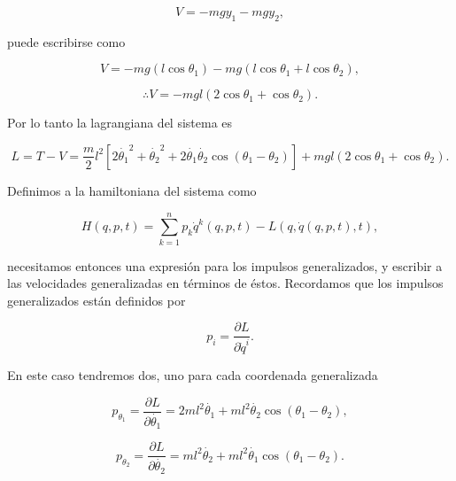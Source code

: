 \documentclass[a4paper,10pt]{article}
\numberwithin{equation}{section}
\begin{document}
\begin{equation}
 V = -mgy_1 - mgy_2,
\end{equation}

puede escribirse como

\begin{equation}
 V = - mg(l\cos{\theta_1}) - mg(l\cos{\theta_1} + l\cos{\theta_2}),
\end{equation}

\begin{equation}
 \therefore V = - mgl(2\cos{\theta_1} + \cos{\theta_2}).
\end{equation}

Por lo tanto la lagrangiana del sistema es 

\begin{equation}
 L = T - V = \frac{m}{2}l^2\left[2\dot{\theta_1}^2 + \dot{\theta_2}^2 
 + 2\dot{\theta_1}\dot{\theta_2}\cos{(\theta_1 - \theta_2)}\right]
 + mgl(2\cos{\theta_1} + \cos{\theta_2}).
\end{equation}

Definimos a la hamiltoniana del sistema como

\begin{equation}
 H(q,p,t) = \sum_{k=1}^n p_k \dot{q}^k(q,p,t) - L(q,\dot{q}(q,p,t),t),
 \label{eq:hamiltonianaDoblePend}
\end{equation}

necesitamos entonces una expresión para los impulsos generalizados, y escribir a las 
velocidades generalizadas en términos de éstos. Recordamos que los impulsos generalizados 
están definidos por 

\begin{equation}
p_i = \frac{\partial L}{\partial \dot{q}^i}.
\end{equation}

En este caso tendremos dos, uno para cada coordenada generalizada

\begin{equation}
 p_{\theta_1} = \frac{\partial L}{\partial \dot{\theta_1}} = 
 2ml^2\dot{\theta_1} + ml^2\dot{\theta_2}\cos{(\theta_1 - \theta_2)},
 \label{eq:impulsoGenTheta1}
\end{equation}

\begin{equation}
 p_{\theta_2} = \frac{\partial L}{\partial \dot{\theta_2}} = 
 ml^2\dot{\theta_2} + ml^2\dot{\theta_1}\cos{(\theta_1 - \theta_2)}.
 \label{eq:impulsoGenTheta2}
\end{equation}
\end{document}
